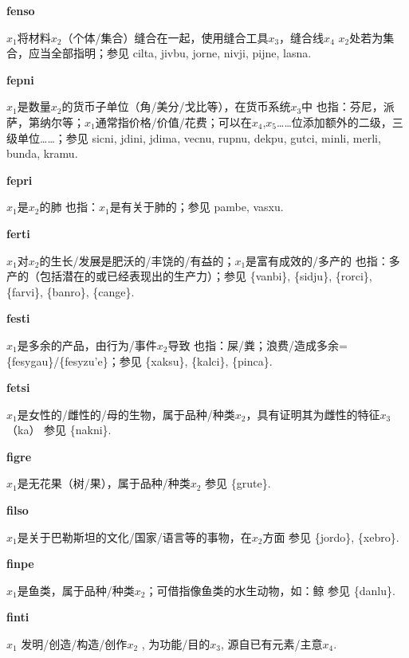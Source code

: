 \documentclass[notitlepage,twocolumn,a4paper,10pt]{book}
\begin{document}
{\sffamily\bfseries fenso}\enspace {\ttfamily\bfseries[fen     fe'o]}  $x_1$将材料$x_2$（个体\slash{}集合）缝合在一起，使用缝合工具$x_3$，缝合线$x_4$ \textemdash{} $x_2$处若为集合，应当全部指明；参见 {cilta}, {jivbu}, {jorne}, {nivji}, {pijne}, {lasna}.

{\sffamily\bfseries fepni}  $x_1$是数量$x_2$的货币子单位（角\slash{}美分\slash{}戈比等），在货币系统$x_3$中 \textemdash{} 也指：芬尼，派萨，第纳尔等；$x_1$通常指价格\slash{}价值\slash{}花费；可以在$x_4$,$x_5$……位添加额外的二级，三级单位……；参见 {sicni}, {jdini}, {jdima}, {vecnu}, {rupnu}, {dekpu}, {gutci}, {minli}, {merli}, {bunda}, {kramu}.

{\sffamily\bfseries fepri} $x_1$是$x_2$的肺 \textemdash{} 也指：$x_1$是有关于肺的；参见 {pambe}, {vasxu}.

{\sffamily\bfseries ferti}\enspace {\ttfamily\bfseries[    fre]}  $x_1$对$x_2$的生长\slash{}发展是肥沃的\slash{}丰饶的\slash{}有益的；$x_1$是富有成效的\slash{}多产的 \textemdash{} 也指：多产的（包括潜在的或已经表现出的生产力）；参见 \{vanbi\}, \{sidju\}, \{rorci\}, \{farvi\}, \{banro\}, \{cange\}.

{\sffamily\bfseries festi}\enspace {\ttfamily\bfseries[fes]}  $x_1$是多余的产品，由行为\slash{}事件$x_2$导致 \textemdash{} 也指：屎\slash{}粪；浪费\slash{}造成多余= \{fesygau\}\slash{}\{fesyzu'e\}；参见 \{xaksu\}, \{kalci\}, \{pinca\}.

{\sffamily\bfseries fetsi}\enspace {\ttfamily\bfseries[fet     fe'i]}  $x_1$是女性的\slash{}雌性的\slash{}母的生物，属于品种\slash{}种类$x_2$，具有证明其为雌性的特征$x_3$（ka） \textemdash{} 参见 \{nakni\}.

{\sffamily\bfseries figre}\enspace {\ttfamily\bfseries[fig]}  $x_1$是无花果（树\slash{}果），属于品种\slash{}种类$x_2$ \textemdash{} 参见 \{grute\}.

{\sffamily\bfseries filso}\enspace {\ttfamily\bfseries[fis]}  $x_1$是关于巴勒斯坦的文化\slash{}国家\slash{}语言等的事物，在$x_2$方面 \textemdash{} 参见 \{jordo\}, \{xebro\}.

{\sffamily\bfseries finpe}\enspace {\ttfamily\bfseries[fip     fi'e]}  $x_1$是鱼类，属于品种\slash{}种类$x_2$；可借指像鱼类的水生动物，如：鲸 \textemdash{} 参见 \{danlu\}.

{\sffamily\bfseries finti}\enspace {\ttfamily\bfseries[fin     fi'i]}  $x_1$ 发明\slash{}创造\slash{}构造\slash{}创作$x_2$ , 为功能\slash{}目的$x_3$, 源自已有元素\slash{}主意$x_4$.
\end{document}
